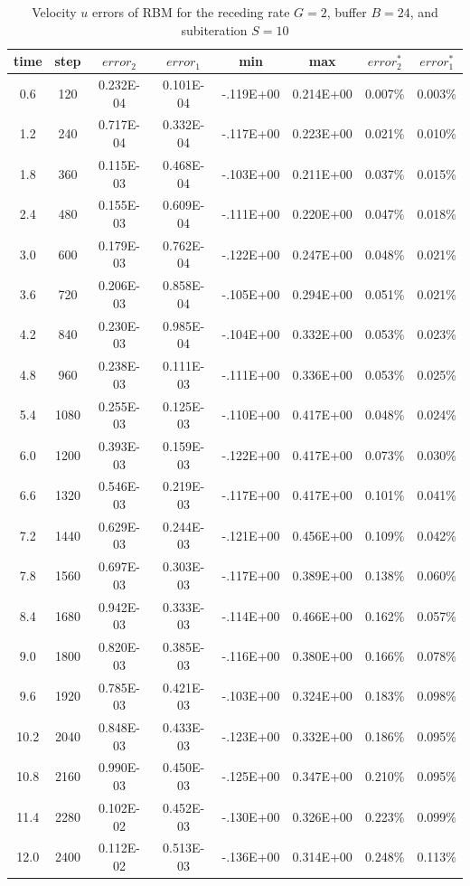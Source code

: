 \begin{table}[hbtp]%
\vspace{0.6in}
\begin{center}
\caption{Velocity $u$ errors of RBM for the receding rate $G=2$, buffer $B=24$, and subiteration $S=10$} %
\small
 \begin{tabular}{cccccccc} \hline %
 time & step & $error_{2}$ & $error_{1}$ &  min & max &  $error_{2}^*$ & $error_{1}^*$ \\ \hline
  0.6 &   120 & 0.232E-04 & 0.101E-04 & -.119E+00 & 0.214E+00 &   0.007\% &   0.003\%  \\
  1.2 &   240 & 0.717E-04 & 0.332E-04 & -.117E+00 & 0.223E+00 &   0.021\% &   0.010\%  \\
  1.8 &   360 & 0.115E-03 & 0.468E-04 & -.103E+00 & 0.211E+00 &   0.037\% &   0.015\%  \\
  2.4 &   480 & 0.155E-03 & 0.609E-04 & -.111E+00 & 0.220E+00 &   0.047\% &   0.018\%  \\
  3.0 &   600 & 0.179E-03 & 0.762E-04 & -.122E+00 & 0.247E+00 &   0.048\% &   0.021\%  \\
  3.6 &   720 & 0.206E-03 & 0.858E-04 & -.105E+00 & 0.294E+00 &   0.051\% &   0.021\%  \\
  4.2 &   840 & 0.230E-03 & 0.985E-04 & -.104E+00 & 0.332E+00 &   0.053\% &   0.023\%  \\
  4.8 &   960 & 0.238E-03 & 0.111E-03 & -.111E+00 & 0.336E+00 &   0.053\% &   0.025\%  \\
  5.4 &  1080 & 0.255E-03 & 0.125E-03 & -.110E+00 & 0.417E+00 &   0.048\% &   0.024\%  \\
  6.0 &  1200 & 0.393E-03 & 0.159E-03 & -.122E+00 & 0.417E+00 &   0.073\% &   0.030\%  \\
  6.6 &  1320 & 0.546E-03 & 0.219E-03 & -.117E+00 & 0.417E+00 &   0.101\% &   0.041\%  \\
  7.2 &  1440 & 0.629E-03 & 0.244E-03 & -.121E+00 & 0.456E+00 &   0.109\% &   0.042\%  \\
  7.8 &  1560 & 0.697E-03 & 0.303E-03 & -.117E+00 & 0.389E+00 &   0.138\% &   0.060\%  \\
  8.4 &  1680 & 0.942E-03 & 0.333E-03 & -.114E+00 & 0.466E+00 &   0.162\% &   0.057\%  \\
  9.0 &  1800 & 0.820E-03 & 0.385E-03 & -.116E+00 & 0.380E+00 &   0.166\% &   0.078\%  \\
  9.6 &  1920 & 0.785E-03 & 0.421E-03 & -.103E+00 & 0.324E+00 &   0.183\% &   0.098\%  \\
 10.2 &  2040 & 0.848E-03 & 0.433E-03 & -.123E+00 & 0.332E+00 &   0.186\% &   0.095\%  \\
 10.8 &  2160 & 0.990E-03 & 0.450E-03 & -.125E+00 & 0.347E+00 &   0.210\% &   0.095\%  \\
 11.4 &  2280 & 0.102E-02 & 0.452E-03 & -.130E+00 & 0.326E+00 &   0.223\% &   0.099\%  \\
 12.0 &  2400 & 0.112E-02 & 0.513E-03 & -.136E+00 & 0.314E+00 &   0.248\% &   0.113\%  \\
 \hline
 \end{tabular}
 \label{tab:1}
 \end{center}
 \end{table}

